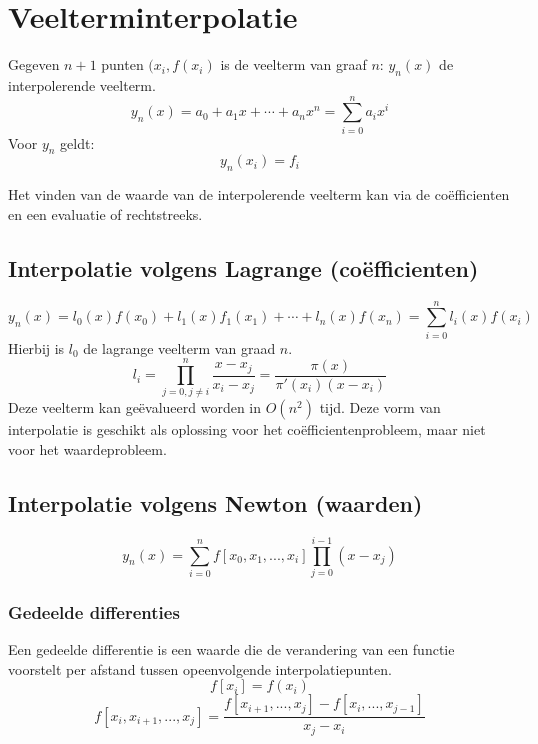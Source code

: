 \documentclass[samenvatting.tex]{subfiles}
\begin{document}
\chapter{Veelterminterpolatie}
\begin{defi}
Gegeven $n+1$ punten $(x_i,f(x_i)$ is de veelterm van graaf $n$: $y_n(x)$ de interpolerende veelterm.
\[
y_n(x) = a_0 + a_1x+ \cdots + a_nx^n = \sum_{i=0}^na_ix^i
\]
Voor $y_n$ geldt:
\[
y_n(x_i) = f_i
\]
\end{defi}
Het vinden van de waarde van de interpolerende veelterm kan via de co\"efficienten en een evaluatie of rechtstreeks.

\section{Interpolatie volgens Lagrange (co\"efficienten)}
\[
y_n(x)
= l_0(x)f(x_0) + l_1(x)f_1(x_1) + \cdots + l_n(x)f(x_n)
= \sum_{i=0}^{n}l_i(x)f(x_i)
\]
Hierbij is $l_0$ de lagrange veelterm van graad $n$.
\[
l_{i} = \prod_{j=0,j\neq i}^{n}\frac{x-x_j}{x_i-x_j} = \frac{\pi(x)}{\pi'(x_i)(x-x_i)}
\]
Deze veelterm kan ge\"evalueerd worden in $O(n^2)$ tijd.
Deze vorm van interpolatie is geschikt als oplossing voor het co\"efficientenprobleem, maar niet voor het waardeprobleem.
\section{Interpolatie volgens Newton (waarden)}
\[
y_n(x) = \sum_{i=0}^{n} f[x_0,x_1,...,x_i] \prod_{j=0}^{i-1}(x-x_j)
\]

\subsection{Gedeelde differenties}
\begin{defi}
Een gedeelde differentie is een waarde die de verandering van een functie voorstelt per afstand tussen opeenvolgende interpolatiepunten.
\[
f[x_i] = f(x_i)
\]
\[
f[x_i,x_{i+1},...,x_{j}] = \frac{f[x_{i+1},...,x_j] - f[x_i,...,x_{j-1}]}{x_j-x_i}
\]
\end{defi}
\end{document}
